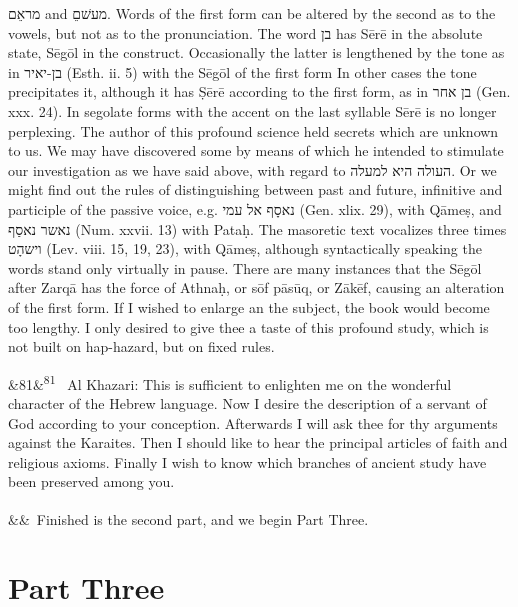 \documentclass[12pt]{article}
\newcommand{\para}[1][]{\par\noindent\ifx&#1&\else\textsuperscript{\footnotesize #1}~\fi}
\begin{document}
‏מראֵם‎ and ‏מעשׁםֵ‎. Words of the first form can be altered by the second as to the vowels, but not as to the pronunciation. The word ‏בן‎ has Sērē in the absolute state, Sēgōl in the construct. Occasionally the latter is lengthened by the tone as in ‏בן-יאיר‎ (Esth. ii. 5) with the Sēgōl of the first form In other cases the tone precipitates it, although it has Ṣērē according to the first form, as in ‏בן אחר‎ (Gen. xxx. 24). In segolate forms with the accent on the last syllable Sērē is no longer perplexing. The author of this profound science held secrets which are unknown to us. We may have discovered some by means of which he intended to stimulate our investigation as we have said above, with regard to ‏העולה היא למעלה‎. Or we might find out the rules of distinguishing between past and future, infinitive and participle of the passive voice, e.g. ‏נאסָף אל עמי‎ (Gen. xlix. 29), with Qāmeṣ, and ‏נאשר נאסַף‎ (Num. xxvii. 13) with Pataḥ. The masoretic text vocalizes three times ‏וישהָט‎ (Lev. viii. 15, 19, 23), with Qāmeṣ, although syntactically speaking the words stand only virtually in pause. There are many instances that the Sēgōl after Zarqā has the force of Athnaḥ, or sōf pāsūq, or Zākēf, causing an alteration of the first form. If I wished to enlarge an the subject, the book would become too lengthy. I only desired to give thee a taste of this profound study, which is not built on hap-hazard, but on fixed rules.

\para[81] Al Khazari: This is sufficient to enlighten me on the wonderful character of the Hebrew language. Now I desire the description of a servant of God according to your conception. Afterwards I will ask thee for thy arguments against the Karaites. Then I should like to hear the principal articles of faith and religious axioms. Finally I wish to know which branches of ancient study have been preserved among you.

\para Finished is the second part, and we begin Part Three.

\section*{Part Three}
\end{document}
